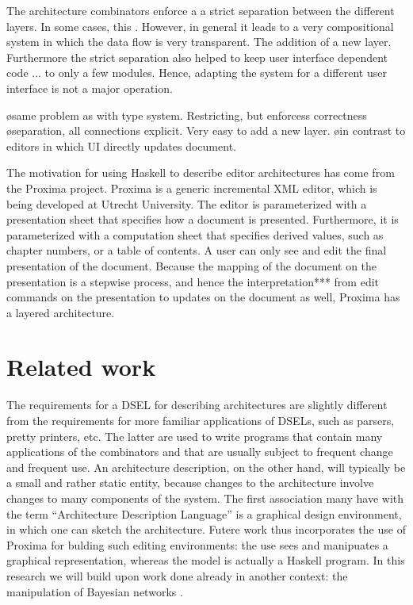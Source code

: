 \documentclass[preprint,natbib]{sigplanconf}
\begin{document}
The architecture combinators enforce a a strict separation between the different layers. In some cases, this . However, in general it leads to a very compositional system in which the data flow is very transparent. The addition of a new layer. Furthermore the strict separation also helped to keep user interface dependent code ... to only a few modules. Hence, adapting the system for a different user interface is not a major operation.

\bl
\o same problem as with type system. Restricting, but enforcess correctness
\o separation, all connections explicit. Very easy to add a new layer. 
\o in contrast to editors in which UI directly updates document.
\el
\ec

\bc
The motivation for using Haskell to describe editor architectures has come from the Proxima project. Proxima is a generic incremental XML editor, which is being developed at Utrecht University. The editor is parameterized with a presentation sheet that specifies how a document is presented. Furthermore, it is parameterized with a computation sheet that specifies derived values, such as chapter numbers, or a table of contents. A user can only see and edit the final presentation of the document. Because the mapping of the document on the presentation is a stepwise process, and hence the interpretation*** from edit commands on the presentation to updates on the document as well, Proxima has a layered architecture.
\ec


\bc
%																
%																
%																
\section{Related work} \label{sect:relatedWork}


The requirements for a DSEL for describing architectures are slightly different from the requirements for more familiar applications of DSELs, such as parsers, pretty printers, etc. The latter are used to write programs that contain many applications of the combinators and that are usually subject to frequent change and frequent use. An architecture description, on the other hand, will typically be a small and rather static entity, because changes to the architecture involve changes to many components of the system. The first association many have with the term ``Architecture Description Language'' is a graphical design environment, in which one can sketch the architecture. Futere work thus incorporates the use of Proxima for bulding such editing environments: the use sees and manipuates a graphical representation, whereas the model is actually a Haskell program. In this research we will build upon work done already in another context: the manipulation of Bayesian networks \cite{schrage05Dazzle}. 
\ec
\end{document}
